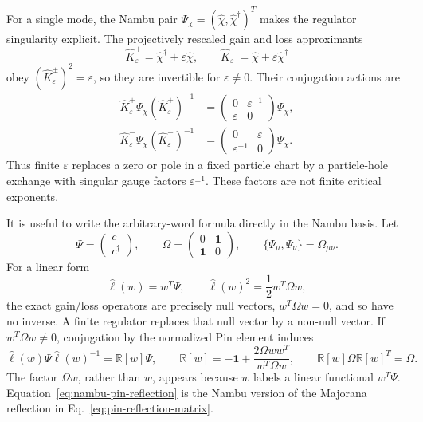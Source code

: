 \documentclass[aps,prb,onecolumn,nofootinbib,superscriptaddress]{revtex4-2}
\newcommand{\I}{\mathbf{1}}
\theoremstyle{plain}
\theoremstyle{definition}
\begin{document}
For a single mode, the Nambu pair
\(\Psi_\chi=(\hat\chi,\hat\chi^\dagger)^T\) makes the regulator singularity
explicit.  The projectively rescaled gain and loss approximants
\begin{equation}
  \hat K^+_\varepsilon=\hat\chi^\dagger+\varepsilon\hat\chi,
  \qquad
  \hat K^-_\varepsilon=\hat\chi+\varepsilon\hat\chi^\dagger
  \label{eq:regulated-gain-loss-approximants}
\end{equation}
obey \((\hat K^\pm_\varepsilon)^2=\varepsilon\), so they are invertible for
\(\varepsilon\ne0\).  Their conjugation actions are
\begin{align}
  \hat K^+_\varepsilon\Psi_\chi(\hat K^+_\varepsilon)^{-1}
  &=
  \begin{pmatrix}
    0 & \varepsilon^{-1}\\
    \varepsilon & 0
  \end{pmatrix}
  \Psi_\chi,
  \label{eq:nambu-gain-transfer}\\
  \hat K^-_\varepsilon\Psi_\chi(\hat K^-_\varepsilon)^{-1}
  &=
  \begin{pmatrix}
    0 & \varepsilon\\
    \varepsilon^{-1} & 0
  \end{pmatrix}
  \Psi_\chi .
  \label{eq:nambu-loss-transfer}
\end{align}
Thus finite \(\varepsilon\) replaces a zero or pole in a fixed particle chart
by a particle-hole exchange with singular gauge factors
\(\varepsilon^{\pm1}\).  These factors are not finite critical exponents.

It is useful to write the arbitrary-word formula directly in the Nambu basis.
Let
\begin{equation}
  \Psi=\begin{pmatrix}c\\ c^\dagger\end{pmatrix},
  \qquad
  \Omega=\begin{pmatrix}0&\I\\ \I&0\end{pmatrix},
  \qquad
  \{\Psi_\mu,\Psi_\nu\}=\Omega_{\mu\nu} .
  \label{eq:nambu-car-form}
\end{equation}
For a linear form
\begin{equation}
  \hat\ell(w)=w^T\Psi,
  \qquad
  \hat\ell(w)^2=\frac{1}{2}w^T\Omega w,
  \label{eq:nambu-linear-form}
\end{equation}
the exact gain/loss operators are precisely null vectors,
\(w^T\Omega w=0\), and so have no inverse.  A finite regulator replaces that
null vector by a non-null vector.  If \(w^T\Omega w\ne0\), conjugation by the
normalized Pin element induces
\begin{equation}
  \hat\ell(w)\Psi\hat\ell(w)^{-1}
  =
  \mathbb R[w]\Psi,
  \qquad
  \mathbb R[w]
  =
  -\I+\frac{2\Omega w w^T}{w^T\Omega w},
  \qquad
  \mathbb R[w]\Omega\mathbb R[w]^T=\Omega .
  \label{eq:nambu-pin-reflection}
\end{equation}
The factor \(\Omega w\), rather than \(w\), appears because \(w\) labels a
linear functional \(w^T\Psi\).  Equation~\eqref{eq:nambu-pin-reflection} is
the Nambu version of the Majorana reflection in
Eq.~\eqref{eq:pin-reflection-matrix}.
\end{document}

